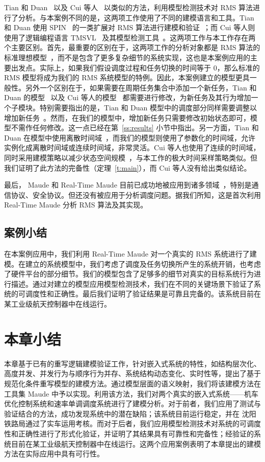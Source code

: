Tian 和 Duan~\cite{TianD2011} 以及 Cui 等人~\cite{DBLP:conf/iceccs/CuiDT14} 以类似的方法，利用模型检测技术对 RMS 算法进行了分析。与本案例不同的是，这两项工作使用了不同的建模语言和工具。Tian 和 Duan 使用 SPIN~\cite{DBLP:journals/tse/Holzmann97} 的一类扩展对 RMS 算法进行建模和验证~\cite{TianD2011}；而 Cui 等人则使用了逻辑编程语言 TMSVL~\cite{DBLP:conf/icfem/HanDW12} 及其模型检测工具~\cite{DBLP:conf/iceccs/CuiDT14}。这两项工作与本工作存在两个主要区别。首先，最重要的区别在于，这两项工作的分析对象都是 RMS 算法的标准理想模型~\cite{DBLP:journals/jacm/LiuL73}，而不是包含了更多复杂细节的系统实现，这也是本案例应用的主要出发点。实际上，如果我们假设调度过程和任务切换的时间等于 0，那么标准的 RMS 模型将成为我们的 RMS 系统模型的特例。因此，本案例建立的模型更具一般性。另外一个区别在于，如果需要在周期任务集合中添加一个新任务，Tian 和 Duan 的模型~\cite{TianD2011} 以及 Cui 等人的模型~\cite{DBLP:conf/iceccs/CuiDT14} 都需要进行修改，为新任务及其行为增加一个子模块。特别需要指出的是，Tian 和 Duan 模型中的调度部分同样需要调整以增加新任务~\cite{TianD2011}。然而，在我们的模型中，增加新任务只需要修改初始状态即可，模型不需作任何修改。这一点已经在第~\ref{ss:results} 小节中指出。另一方面，Tian 和 Duan 在模型中使用离散时间域~\cite{TianD2011}，而我们的模型则使用了参数化的时间域，允许实例化成离散时间域或连续时间域，非常灵活。Cui 等人也使用了连续的时间域，同时采用建模策略以减少状态空间规模~\cite{DBLP:conf/iceccs/CuiDT14}，与本工作的极大时间采样策略类似。但我们证明了此方法的完备性（定理~\ref{t:main}），而 Cui 等人没有给出类似结论。

最后， Maude 和 Real-Time Maude 目前已成功地被应用到诸多领域~\cite{DBLP:journals/jlp/Meseguer12}，特别是通信协议、安全协议。但还没有被应用于分析调度问题。据我们所知，这是首次利用 Real-Time Maude 分析 RMS 算法及其实现。


\subsection{案例小结}
\label{s:conclusion}
在本案例应用中，我们利用 Real-Time Maude 对一个真实的 RMS 系统进行了建模。在建立的系统模型中，我们考虑了调度及任务切换所产生的系统开销，也考虑了硬件平台的部分细节。我们的模型包含了足够多的细节对真实的目标系统行为进行描述。通过对建立的模型应用模型检测技术，我们在不同的关键场景下验证了系统的可调度性和正确性。最后我们证明了验证结果是可靠且完备的。该系统目前在某工业级航天控制器中在线运行。


\section{本章小结}

本章基于已有的重写逻辑建模验证工作，针对嵌入式系统的特性，如结构层次化、高度并发、并发行为与顺序行为并存、系统结构动态变化、实时性等，提出了基于规范化条件重写模型的建模方法。通过模型层面的语义映射，我们将该建模方法在工具集 Maude 中予以实现。利用该方法，我们对两个真实的嵌入式系统——机车优化控制系统和速率单调调度系统进行了建模分析。对于前者，我们应用了测试与验证结合的方法，成功发现系统中的潜在缺陷；该系统目前运行稳定，并在
沈阳铁路局通过了实车运用考核。而对于后者，我们应用模型检测技术对系统的可调度性和正确性进行了形式化验证，并证明了其结果具有可靠性和完备性；经验证的系统目前在某工业级航天控制器中在线运行。这两个应用案例表明了本章提出的建模方法在实际应用中具有可行性。

